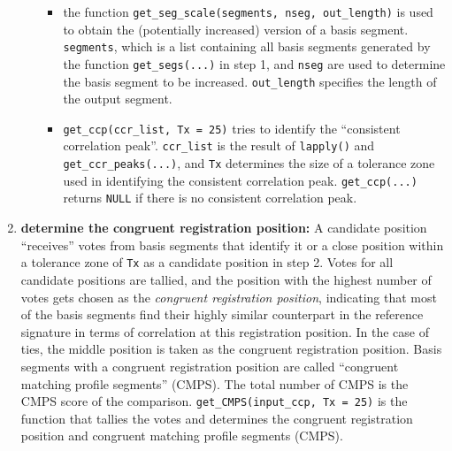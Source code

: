 \begin{enumerate}
\begin{itemize}
    \begin{itemize}
    \tightlist
    \item
      the function \texttt{get\_seg\_scale(segments,\ nseg,\ out\_length)} is used to obtain the (potentially increased) version of a basis segment. \texttt{segments}, which is a list containing all basis segments generated by the function \texttt{get\_segs(...)} in step 1, and \texttt{nseg} are used to determine the basis segment to be increased. \texttt{out\_length} specifies the length of the output segment.
    \item
      \texttt{get\_ccp(ccr\_list,\ Tx\ =\ 25)} tries to identify the ``consistent correlation peak''. \texttt{ccr\_list} is the result of \texttt{lapply()} and \texttt{get\_ccr\_peaks(...)}, and \texttt{Tx} determines the size of a tolerance zone used in identifying the consistent correlation peak. \texttt{get\_ccp(...)} returns \texttt{NULL} if there is no consistent correlation peak.
    \end{itemize}
  \end{itemize}
\item
  \textbf{determine the congruent registration position:} A candidate position ``receives'' votes from basis segments that identify it or a close position within a tolerance zone of \texttt{Tx} as a candidate position in step 2.
  Votes for all candidate positions are tallied, and the position with the highest number of votes gets chosen as the \emph{congruent registration position}, indicating that most of the basis segments find their highly similar counterpart in the reference signature in terms of correlation at this registration position.
  In the case of ties, the middle position is taken as the congruent registration position.
  Basis segments with a congruent registration position are called ``congruent matching profile segments'' (CMPS).
  The total number of CMPS is the CMPS score of the comparison.
  \texttt{get\_CMPS(input\_ccp,\ Tx\ =\ 25)} is the function that tallies the votes and determines the congruent registration position and congruent matching profile segments (CMPS).
\end{enumerate}

